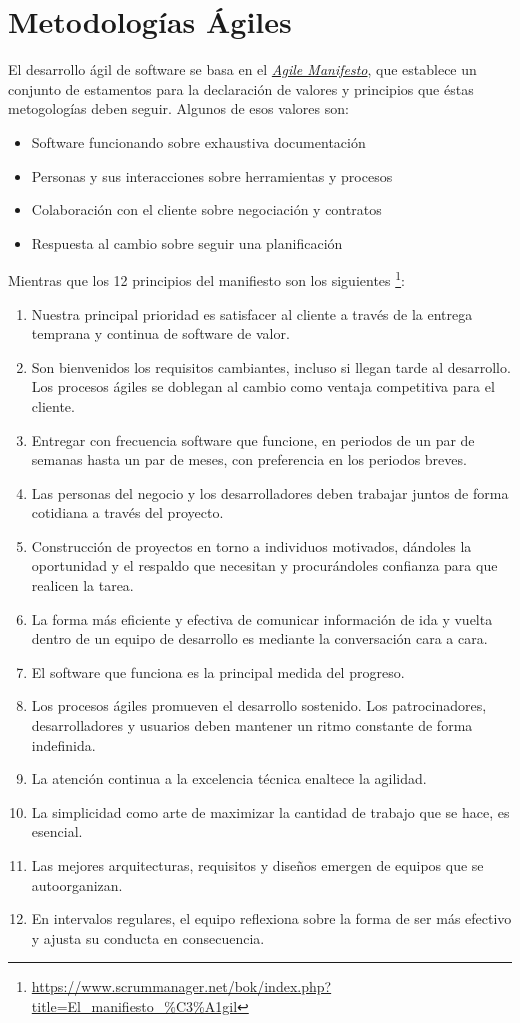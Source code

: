 \documentclass{article}
\begin{document}
\section{Metodologías Ágiles}

El desarrollo ágil de software se basa en el \href{https://agilemanifesto.org/}{\textit{Agile Manifesto}}, que establece un conjunto de estamentos para la declaración de valores y principios que éstas metogologías deben seguir.
Algunos de esos valores son:
\begin{itemize}
\item Software funcionando sobre exhaustiva documentación
\item Personas y sus interacciones sobre herramientas y procesos
\item Colaboración con el cliente sobre negociación y contratos
\item Respuesta al cambio sobre seguir una planificación
\end{itemize}

Mientras que los 12 principios del manifiesto son los siguientes \footnote{\url{https://www.scrummanager.net/bok/index.php?title=El_manifiesto_\%C3\%A1gil}}:

\begin{enumerate}
\item Nuestra principal prioridad es satisfacer al cliente a través de la entrega temprana y continua de software de valor.
\item Son bienvenidos los requisitos cambiantes, incluso si llegan tarde al desarrollo. Los procesos ágiles se doblegan al cambio como ventaja competitiva para el cliente.
\item Entregar con frecuencia software que funcione, en periodos de un par de semanas hasta un par de meses, con preferencia en los periodos breves.
\item Las personas del negocio y los desarrolladores deben trabajar juntos de forma cotidiana a través del proyecto.
\item Construcción de proyectos en torno a individuos motivados, dándoles la oportunidad y el respaldo que necesitan y procurándoles confianza para que realicen la tarea.
\item La forma más eficiente y efectiva de comunicar información de ida y vuelta dentro de un equipo de desarrollo es mediante la conversación cara a cara.
\item El software que funciona es la principal medida del progreso.
\item Los procesos ágiles promueven el desarrollo sostenido. Los patrocinadores, desarrolladores y usuarios deben mantener un ritmo constante de forma indefinida.
\item La atención continua a la excelencia técnica enaltece la agilidad.
\item La simplicidad como arte de maximizar la cantidad de trabajo que se hace, es esencial.
\item Las mejores arquitecturas, requisitos y diseños emergen de equipos que se autoorganizan.
\item En intervalos regulares, el equipo reflexiona sobre la forma de ser más efectivo y ajusta su conducta en consecuencia.
\end{enumerate}
\end{document}
